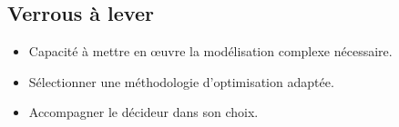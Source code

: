 \documentclass[xcolor=x11names, compress, 11pt]{beamer}
\begin{document}


\subsection{Verrous à lever}
\begin{frame}[t]
    \vfill
    \small
    \begin{itemize}
        \item Capacité à mettre en œuvre la modélisation complexe nécessaire.
        \vfill
        \item Sélectionner une méthodologie d’optimisation adaptée.
        \vfill
        \item Accompagner le décideur dans son choix.
    \end{itemize}
    \vfill
\end{frame}
\end{document}
